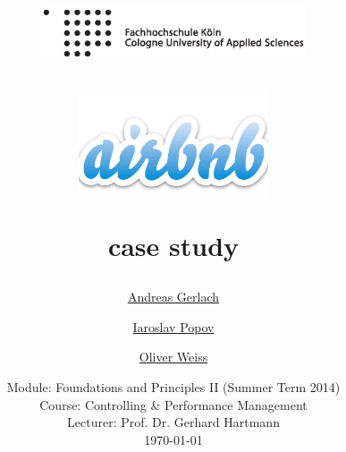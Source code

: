 \documentclass[a4paper]{article}
\begin{document}
	\title{
	\begin{figure}[!ht]
		\flushleft
			\includegraphics[width=0.7\textwidth]{assets/logo.eps}
	\end{figure}
	\vspace{1cm}
    \begin{figure}[!ht]
    	\center
    		\includegraphics[width=0.5\textwidth]{assets/Airbnb_Logo.png}
    \end{figure}
	\Huge case study
	}

	\vspace{1cm}


	\author{\Large \href{mailto:andreas.gerlach@smail.fh-koeln.de}{Andreas Gerlach} \and \Large \href{mailto:iaroslav.popov@gmail.com}{Iaroslav Popov} \and \Large \href{mailto:oweiss@fh-koeln.de}{Oliver Weiss}
	\vspace{1cm}}

	\date{
	\large Module: Foundations and Principles II (Summer Term 2014)\\ Course: Controlling \& Performance Management \\
	\vspace{0.8cm}
	\large Lecturer: Prof. Dr. Gerhard Hartmann \\
	\vspace{1cm}
	\today
	}

	\maketitle
	\setlength{\parindent}{0pt}












%



\end{document}
